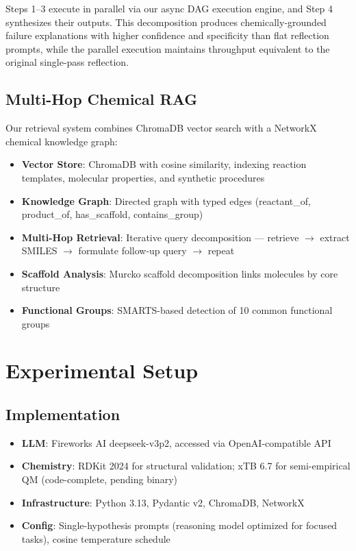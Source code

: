 \documentclass{article}
\begin{document}
Steps 1--3 execute in parallel via our async DAG execution engine, and Step 4 synthesizes their outputs. This decomposition produces chemically-grounded failure explanations with higher confidence and specificity than flat reflection prompts, while the parallel execution maintains throughput equivalent to the original single-pass reflection.

\subsection{Multi-Hop Chemical RAG}

Our retrieval system combines ChromaDB vector search with a NetworkX chemical knowledge graph:

\begin{itemize}
    \item \textbf{Vector Store}: ChromaDB with cosine similarity, indexing reaction templates, molecular properties, and synthetic procedures
    \item \textbf{Knowledge Graph}: Directed graph with typed edges (reactant\_of, product\_of, has\_scaffold, contains\_group)
    \item \textbf{Multi-Hop Retrieval}: Iterative query decomposition — retrieve $\rightarrow$ extract SMILES $\rightarrow$ formulate follow-up query $\rightarrow$ repeat
    \item \textbf{Scaffold Analysis}: Murcko scaffold decomposition links molecules by core structure
    \item \textbf{Functional Groups}: SMARTS-based detection of 10 common functional groups
\end{itemize}

\section{Experimental Setup}

\subsection{Implementation}
\begin{itemize}
    \item \textbf{LLM}: Fireworks AI deepseek-v3p2, accessed via OpenAI-compatible API
    \item \textbf{Chemistry}: RDKit 2024 for structural validation; xTB 6.7 for semi-empirical QM (code-complete, pending binary)
    \item \textbf{Infrastructure}: Python 3.13, Pydantic v2, ChromaDB, NetworkX
    \item \textbf{Config}: Single-hypothesis prompts (reasoning model optimized for focused tasks), cosine temperature schedule
\end{itemize}
\end{document}
